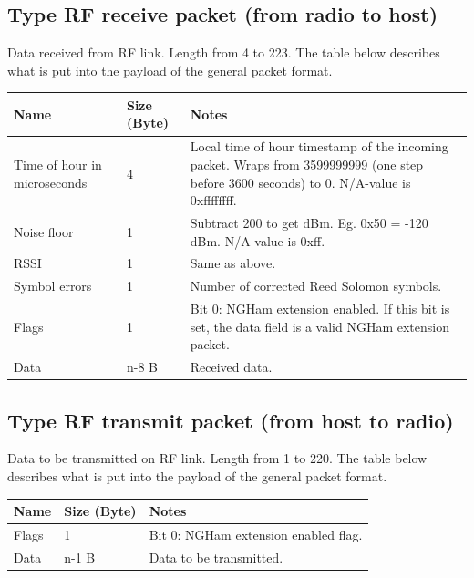 \documentclass[a4paper, english, 12pt, hidelinks]{article}
\begin{document}
    \subsection{Type RF receive packet (from radio to host)}
        Data received from RF link. Length from 4 to 223. The table below describes what is put into the
        payload of the general packet format.
		\begin{table}[H]
			\centering
			\begin{tabular}{|p{3cm}|p{2cm}|p{10cm}|}
				\hline
				Name & Size (Byte) & Notes \\
				\hline
                Time of hour in microseconds & 4 & Local time of hour timestamp of the incoming packet. 
                Wraps from 3599999999 (one step before 3600 seconds) to 0. N/A-value is 0xffffffff. \\          
                Noise floor & 1 & Subtract 200 to get dBm. Eg. 0x50 = -120 dBm. N/A-value is 0xff. \\
                RSSI & 1 & Same as above. \\
                Symbol errors & 1 & Number of corrected Reed Solomon symbols. \\
                Flags & 1 & Bit 0: NGHam extension enabled. If this bit is set, the data field is a valid NGHam extension packet.  \\
                Data & n-8 B & Received data. \\
				\hline
			\end{tabular}
		\end{table}

    \subsection{Type RF transmit packet (from host to radio)}
        Data to be transmitted on RF link. Length from 1 to 220. The table below describes what is 
        put into the payload of the general packet format.
		\begin{table}[H]
			\centering
			\begin{tabular}{|p{3cm}|p{2cm}|p{10cm}|}
				\hline
				Name & Size (Byte) & Notes \\
				\hline
                Flags & 1 & Bit 0: NGHam extension enabled flag. \\
                Data & n-1 B & Data to be transmitted. \\
				\hline
			\end{tabular}
		\end{table}
\end{document}
